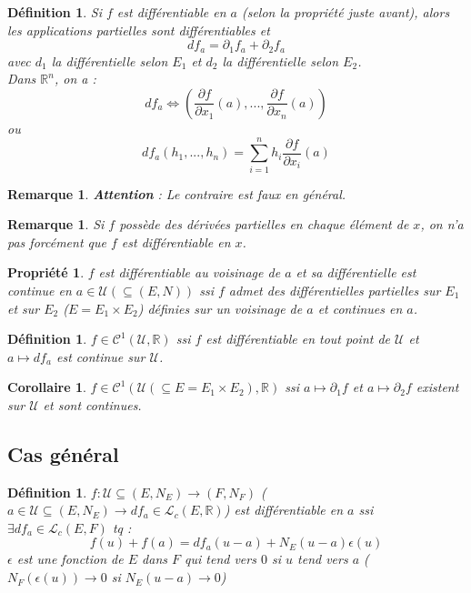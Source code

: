\documentclass[a4paper, oneside]{report}
\theoremstyle{break}
\newtheorem{defi}[thm]{Définition}
\newtheorem{propr}[thm]{Propriété}
\newtheorem{cor}[thm]{Corollaire}
\newtheorem{remar}[thm]{Remarque}
\newcommand{\x}{\times}
\newcommand{\R}{\mathbb{R}}
\newcommand{\U}{\mathcal{U}}
\renewcommand{\L}{\mathcal{L}}
\begin{document}
\begin{defi}
Si $f$ est différentiable en $a$ (selon la propriété juste avant), alors les applications partielles sont différentiables et
$$df_a= \partial_1f_a+\partial_2f_a$$
avec $d_1$ la différentielle selon $E_1$ et $d_2$ la différentielle selon $E_2$.\\
Dans $\R^n$, on a :
$$df_a\Leftrightarrow (\frac{\partial f}{\partial x_1}(a),...,\frac{\partial f}{\partial x_n}(a))$$
ou
$$df_a(h_1,...,h_n)=\sum_{i=1}^n h_i \frac{\partial f}{\partial x_i}(a)$$
\end{defi}

\begin{remar}
\textbf{Attention} : Le contraire est faux en général.
\end{remar}

\begin{remar}
Si $f$ possède des dérivées partielles en chaque élément de $x$, on n'a pas forcément que $f$ est différentiable en $x$.
\end{remar}

\begin{propr}
$f$ est différentiable au voisinage de $a$ et sa différentielle est continue en $a\in \U (\subseteq (E,N))$ ssi $f$ admet des différentielles partielles sur $E_1$ et sur $E_2$ ($E=E_1\x E_2$) définies sur un voisinage de $a$ et continues en $a$.
\end{propr}

\begin{defi}
$f \in \mathcal{C}^1(\U, \R)$ ssi $f$ est différentiable en tout point de $\U$ et $a\mapsto df_a$ est continue sur $\U$.
\end{defi}

\begin{cor}
$f\in \mathcal{C}^1(\U(\subseteq E=E_1\x E_2),\R)$ ssi $a\mapsto \partial_1f$ et $a\mapsto \partial_2f$ existent sur $\U$ et sont continues.
\end{cor}

\subsection{Cas général}

\begin{defi}
$f : \U \subseteq (E,N_E) \rightarrow (F,N_F)$ ($a\in \U \subseteq (E,N_E) \rightarrow df_a\in \L_c(E,\R)$) est différentiable en $a$ ssi $\exists df_a \in \L_c(E,F)$ tq :
$$f(u)+f(a)=df_a(u-a)+N_E(u-a)\epsilon(u)$$
$\epsilon$ est une fonction de $E$ dans $F$ qui tend vers $0$ si $u$ tend vers $a$ ($N_F(\epsilon(u)) \rightarrow 0$ si $N_E(u-a)\rightarrow 0$)
\end{defi}
\end{document}
